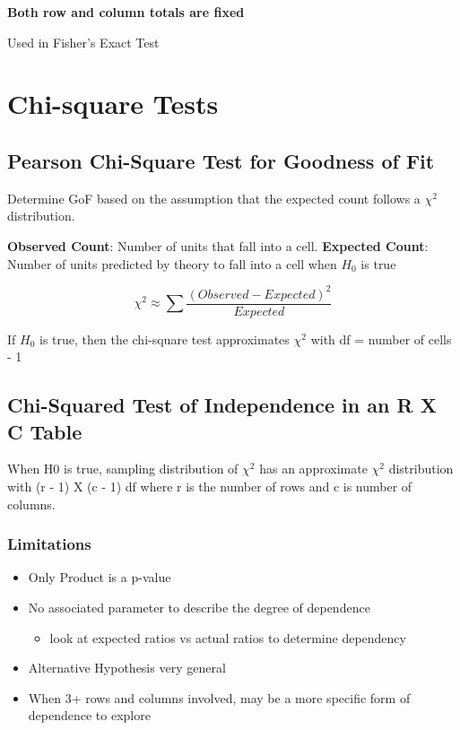 \documentclass[11pt]{article}
\begin{document}
\textbf{Both row and column totals are fixed}

Used in Fisher's Exact Test

\section{Chi-square Tests}
\label{sec:orgeca29cc}
\subsection{Pearson Chi-Square Test for Goodness of Fit}
\label{sec:orgc23d9bd}
Determine GoF based on the assumption that the expected count follows a
\(\chi^2\) distribution.

\textbf{Observed Count}: Number of units that fall into a cell. \textbf{Expected
Count}: Number of units predicted by theory to fall into a cell when
\(H_0\) is true

$$
    \chi^2 \approx \sum\frac{(Observed - Expected)^2}{Expected}
$$

If \(H_0\) is true, then the chi-square test approximates \(\chi^2\) with df
= number of cells - 1

\subsection{Chi-Squared Test of Independence in an R X C Table}
\label{sec:org45fe101}
When H0 is true, sampling distribution of \(\chi^2\) has an approximate
\(\chi^2\) distribution with (r - 1) X (c - 1) df where r is the number of
rows and c is number of columns.

\subsubsection{Limitations}
\label{sec:orgf4d3a83}
\begin{itemize}
\item Only Product is a p-value
\item No associated parameter to describe the degree of dependence

\begin{itemize}
\item look at expected ratios vs actual ratios to determine dependency
\end{itemize}

\item Alternative Hypothesis very general
\item When 3+ rows and columns involved, may be a more specific form of
dependence to explore
\end{itemize}
\end{document}
